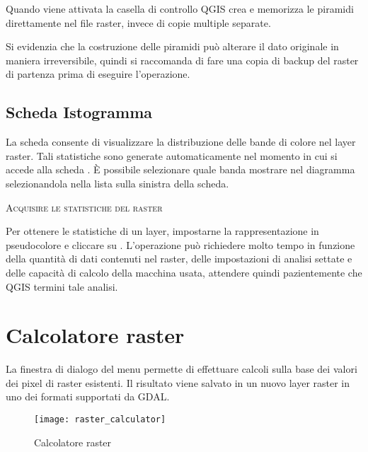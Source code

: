 Quando viene attivata la casella di controllo  QGIS crea e memorizza le piramidi direttamente nel file raster, 
invece di copie multiple separate.

Si evidenzia che la costruzione delle piramidi può alterare il dato originale
in maniera irreversibile, quindi si raccomanda di fare una copia di backup del
raster di partenza prima di eseguire l'operazione.

\subsection{Scheda Istogramma}\label{label_histogram}

La scheda  consente di visualizzare la distribuzione
 delle bande di colore nel layer raster.
Tali statistiche sono generate automaticamente nel momento in cui si accede 
alla scheda . 
È possibile selezionare quale banda mostrare nel diagramma selezionandola 
nella lista sulla sinistra della scheda. 

\begin{Tip}\caption{\textsc{Acquisire le statistiche del raster}}
Per ottenere le statistiche di un layer, impostarne la
rappresentazione in pseudocolore e cliccare su . L'operazione
può richiedere molto tempo in funzione della quantità di dati contenuti nel
raster, delle impostazioni di analisi settate e delle capacità di calcolo
della macchina usata, attendere quindi pazientemente
che QGIS termini tale analisi.
\end{Tip}

\section{Calcolatore raster}\label{sec:raster_calc}

La finestra di dialogo  del menu  
permette di effettuare calcoli sulla base dei valori dei pixel di raster esistenti.
Il risultato viene salvato in un nuovo layer raster in uno dei formati supportati da GDAL. 

\begin{figure}[ht]
  \centering
    \texttt{[image: raster\_calculator]}
    \caption{Calcolatore raster \nixcaption}\label{fig:raster_calculator}
\end{figure}

